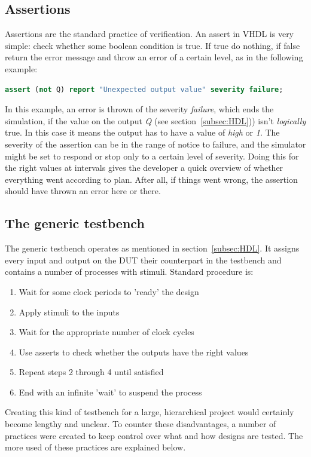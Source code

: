 \documentclass[11pt,british]{article}
\begin{document}
\subsection{Assertions}
\label{subsec:assertions}
Assertions are the standard practice of verification. An assert in VHDL is very simple: check whether some boolean condition is true.\cite{assertformal} If true do nothing, if false return the error message and throw an error of a certain level, as in the following example:
\begin{lstlisting}[language=VHDL, tabsize=4, frame=single, framesep=3mm, belowskip=8pt, aboveskip=8pt, showstringspaces=false, basicstyle=\small, linewidth=\textwidth]
assert (not Q) report "Unexpected output value" severity failure;
\end{lstlisting}
In this example, an error is thrown of the severity \emph{failure}, which ends the simulation, if the value on the output \emph{Q} (see section~\ref{subsec:HDL})) isn't \emph{logically} true. In this case it means the output has to have a value of \emph{high} or \emph{1}. The severity of the assertion can be in the range of notice to failure, and the simulator might be set to respond or stop only to a certain level of severity. Doing this for the right values at intervals gives the developer a quick overview of whether everything went according to plan. After all, if things went wrong, the assertion should have thrown an error here or there.

\subsection{The generic testbench}
The generic testbench operates as mentioned in section~\ref{subsec:HDL}. It assigns every input and output on the \gls{DUT} their counterpart in the testbench and contains a number of processes with stimuli.\cite{generictestbench} Standard procedure is:
\begin{enumerate}%
\item Wait for some clock periods to 'ready' the design
\item Apply stimuli to the inputs
\item Wait for the appropriate number of clock cycles
\item Use asserts to check whether the outputs have the right values
\item Repeat steps 2 through 4 until satisfied
\item End with an infinite 'wait' to suspend the process
\end{enumerate}
Creating this kind of testbench for a large, hierarchical project would certainly become lengthy and unclear. To counter these disadvantages, a number of practices were created to keep control over what and how designs are tested. The more used of these practices are explained below.
\end{document}
